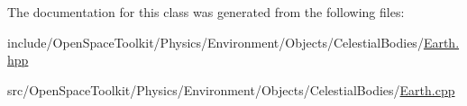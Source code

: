 The documentation for this class was generated from the following files\+:\begin{DoxyCompactItemize}
\item 
include/\+Open\+Space\+Toolkit/\+Physics/\+Environment/\+Objects/\+Celestial\+Bodies/\hyperlink{_objects_2_celestial_bodies_2_earth_8hpp}{Earth.\+hpp}\item 
src/\+Open\+Space\+Toolkit/\+Physics/\+Environment/\+Objects/\+Celestial\+Bodies/\hyperlink{_objects_2_celestial_bodies_2_earth_8cpp}{Earth.\+cpp}\end{DoxyCompactItemize}
